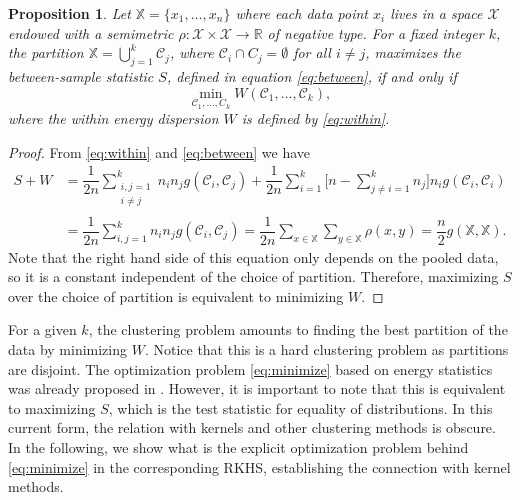 \documentclass[aps,preprint,nofootinbib,floatfix]{revtex4-1}
\newtheorem{proposition}[theorem]{Proposition}
\newcommand\C{{\mathcal{C}}}
\begin{document}
\begin{proposition}
\label{th:minimize}
Let $\mathbb{X} = \{x_1,\dotsc,x_n\}$ where each data point
$x_i$ lives in a space $\mathcal{X}$ endowed with a semimetric $\rho:
\mathcal{X}\times\mathcal{X} \to \mathbb{R}$ of
negative type. For a fixed integer $k$,
the partition
$\mathbb{X} = \bigcup_{j=1}^k \C_j$, where $\C_i \cap C_j = \emptyset$ for
all $i\ne j$, maximizes the between-sample statistic $S$, defined
in equation \eqref{eq:between}, if and only if
\begin{equation}
\label{eq:minimize}
\min_{\C_1,\dotsc,C_k  } W(
\C_1, \dotsc, \C_k),
\end{equation}
where the within energy dispersion $W$ is defined by \eqref{eq:within}.
\end{proposition}
\begin{proof}
From \eqref{eq:within} and \eqref{eq:between}
we have
\begin{equation}
\begin{split}
S + W &= 
\dfrac{1}{2n} \sum_{\substack{i,j=1 \\ i\ne j}}^k n_i n_j g(\C_i, \C_j)
+ \dfrac{1}{2n} \sum_{i=1}^{k} 
\bigg[ n - 
\sum_{j\ne i = 1}^k n_j \bigg] 
n_i g(\C_i, \C_i) \\
& = \dfrac{1}{2n} \sum_{i,j=1}^k n_i n_j g(\C_i, \C_j)
= \dfrac{1}{2n} \sum_{x \in \mathbb{X}} \sum_{y \in \mathbb{X}} \rho(x,y)
= \dfrac{n}{2} g(\mathbb{X}, \mathbb{X}).
\end{split}
\end{equation}
Note that the right hand side of this equation 
only depends on the pooled data, so it is a constant
independent of the choice of partition. Therefore, maximizing
$S$ over the choice of partition is equivalent to minimizing $W$.
\end{proof}

For a given $k$, the clustering problem amounts to
finding the best partition of the data by minimizing $W$.
Notice that this is a hard clustering problem as partitions
are disjoint. The optimization problem \eqref{eq:minimize} based on
energy statistics was already proposed in \cite{Kgroups}. However, it is
important to note that this is equivalent to maximizing $S$,
which is the test statistic for equality of distributions. In this current
form, the relation with kernels and other clustering methods is obscure.
In the following, we show what is the explicit optimization problem behind 
\eqref{eq:minimize} in the corresponding RKHS, 
establishing the connection with kernel methods.
\end{document}
